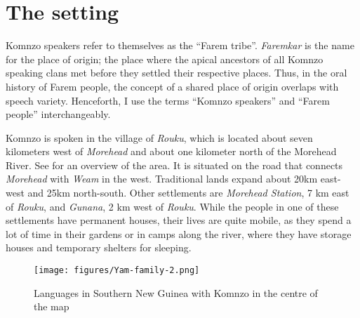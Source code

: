 \section{The setting}\label{sec:setting}

Komnzo speakers refer to themselves as the ``Farem tribe''. \textit{Faremkar} is the name for the place of origin; the place where the apical ancestors of all Komnzo speaking clans met before they settled their respective places. Thus, in the oral history of Farem people, the concept of a shared place of origin overlaps with speech variety. Henceforth, I use the terms ``Komnzo speakers'' and ``Farem people'' interchangeably.

Komnzo is spoken in the village of \textit{Rouku}, which is located about seven kilometers west of \textit{Morehead} and about one kilometer north of the Morehead River. See  for an overview of the area. It is situated on the road that connects \textit{Morehead} with \textit{Weam} in the west. Traditional lands expand about 20km east-west and 25km north-south. Other settlements are \textit{Morehead Station}, 7 km east of \textit{Rouku}, and \textit{Gunana}, 2 km west of \textit{Rouku}. While the people in one of these settlements have permanent houses, their lives are quite mobile, as they spend a lot of time in their gardens or in camps along the river, where they have storage houses and temporary shelters for sleeping.

\begin{figure}
    \centering
    \texttt{[image: figures/Yam-family-2.png]}
    \caption{Languages in Southern New Guinea with Komnzo in the centre of the map}
    \label{fig:sng-map}
\end{figure}


